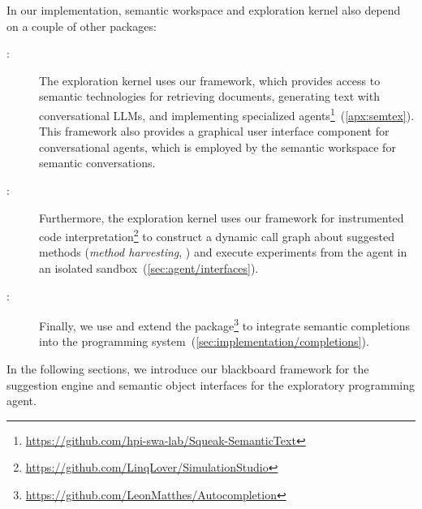 In our implementation, semantic workspace and exploration kernel also depend on a couple of other packages:

\begin{description}
	\item[\semtex:]
	The exploration kernel uses our \semtex framework, which provides access to semantic technologies for retrieving documents, generating text with conversational LLMs, and implementing specialized agents\footnote{\url{https://github.com/hpi-swa-lab/Squeak-SemanticText}}~(\cref{apx:semtex}).
	This framework also provides a graphical user interface component for conversational agents, which is employed by the semantic workspace for semantic conversations.

	\item[:]
	Furthermore, the exploration kernel uses our  framework for instrumented code interpretation\footnote{\url{https://github.com/LinqLover/SimulationStudio}} to construct a dynamic call graph about suggested methods (\emph{method harvesting}, ) and execute experiments from the agent in an isolated sandbox~(\cref{sec:agent/interfaces}).

	\item[:]
	Finally, we use and extend the  package\footnote{\url{https://github.com/LeonMatthes/Autocompletion}} to integrate semantic completions into the programming system~(\cref{sec:implementation/completions}).
\end{description}

In the following sections, we introduce our blackboard framework for the suggestion engine and semantic object interfaces for the exploratory programming agent.
